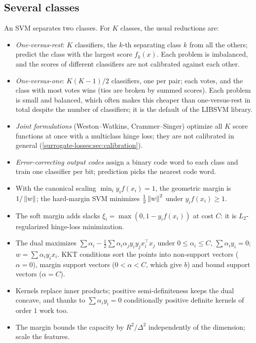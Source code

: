 \begin{notechapter}
\section{Several classes}\label{svm:sec:multiclass}

An SVM separates two classes. For $K$ classes, the usual reductions are:
\begin{itemize}[nosep]
  \item \emph{One-versus-rest}: $K$ classifiers, the $k$-th separating class $k$ from all the
        others; predict the class with the largest score $f_k(x)$. Each problem is imbalanced, and the scores of different
        classifiers are not calibrated against each other.
  \item \emph{One-versus-one}: $K(K - 1)/2$ classifiers, one per pair; each votes, and the class
        with most votes wins (ties are broken by summed scores). Each problem is small
        and balanced, which often makes this cheaper than one-versus-rest in total
        despite the number of classifiers; it is the default of the LIBSVM library.
  \item \emph{Joint formulations} (Weston--Watkins, Crammer--Singer) optimize all $K$ score
        functions at once with a multiclass hinge loss; they are not calibrated in
        general (\cref{surrogate-losses:sec:calibration}).
  \item \emph{Error-correcting output codes} assign a binary code word to each class and
        train one classifier per bit; prediction picks the nearest code word.
\end{itemize}

\begin{chaptersummary}
\begin{itemize}[nosep]
  \item With the canonical scaling $\min_iy_if(x_i) = 1$, the geometric margin is $1/\left\|w\right\|$; the
        hard-margin SVM minimizes $\frac12\left\|w\right\|^2$ under $y_if(x_i)\geq1$.
  \item The soft margin adds slacks $\xi_i = \max(0, 1 - y_if(x_i))$ at cost $C$: it is $L_2$-regularized
        hinge-loss minimization.
  \item The dual maximizes $\sum\alpha_i - \frac12\sum\alpha_i\alpha_jy_iy_jx_i^\top x_j$ under $0\leq\alpha_i\leq C$, $\sum\alpha_iy_i = 0$; $w = \sum\alpha_iy_ix_i$. KKT
        conditions sort the points into non-support vectors ($\alpha = 0$), margin support
        vectors ($0<\alpha<C$, which give $b$) and bound support vectors ($\alpha = C$).
  \item Kernels replace inner products; positive semi-definiteness keeps the dual
        concave, and thanks to $\sum\alpha_iy_i = 0$ conditionally positive definite kernels of order
        $1$ work too.
  \item The margin bounds the capacity by $R^2/\Delta^2$ independently of the dimension; scale the
        features.
\end{itemize}
\end{chaptersummary}


\end{notechapter}
